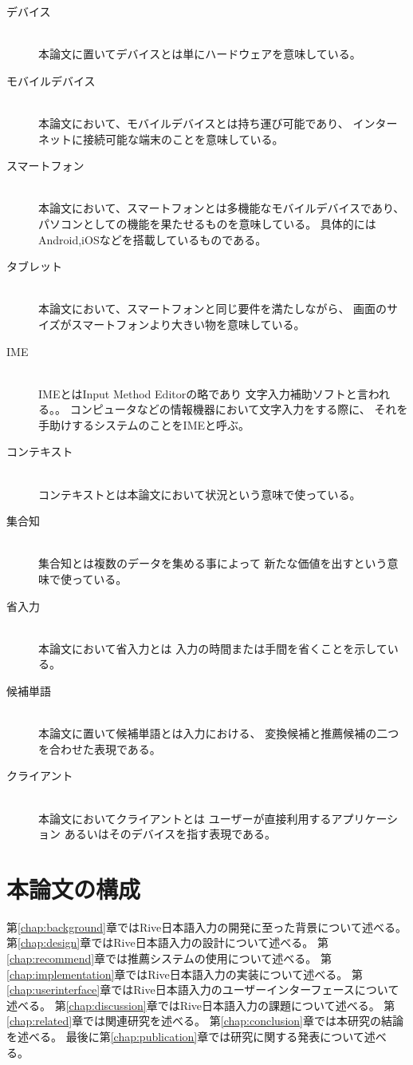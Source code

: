 \begin{description}
  \item[デバイス]\mbox{}\\
    本論文に置いてデバイスとは単にハードウェアを意味している。
  \item[モバイルデバイス]\mbox{}\\
    本論文において、モバイルデバイスとは持ち運び可能であり、
    インターネットに接続可能な端末のことを意味している。
  \item[スマートフォン]\mbox{}\\
    本論文において、スマートフォンとは多機能なモバイルデバイスであり、
    パソコンとしての機能を果たせるものを意味している。
    具体的にはAndroid,iOSなどを搭載しているものである。
  \item[タブレット]\mbox{}\\
    本論文において、スマートフォンと同じ要件を満たしながら、
    画面のサイズがスマートフォンより大きい物を意味している。
  \item[IME]\mbox{}\\
    IMEとはInput Method Editorの略であり
    文字入力補助ソフトと言われる。。
    コンピュータなどの情報機器において文字入力をする際に、
    それを手助けするシステムのことをIMEと呼ぶ。
  \item[コンテキスト]\mbox{}\\
    コンテキストとは本論文において状況という意味で使っている。
  \item[集合知]\mbox{}\\
    集合知とは複数のデータを集める事によって
    新たな価値を出すという意味で使っている。
  \item[省入力]\mbox{}\\
    本論文において省入力とは
    入力の時間または手間を省くことを示している。
  \item[候補単語]\mbox{}\\
    本論文に置いて候補単語とは入力における、
    変換候補と推薦候補の二つを合わせた表現である。
  \item[クライアント]\mbox{}\\
    本論文においてクライアントとは
    ユーザーが直接利用するアプリケーション
    あるいはそのデバイスを指す表現である。
\end{description}

\section{本論文の構成}
第\ref{chap:background}章ではRive日本語入力の開発に至った背景について述べる。
第\ref{chap:design}章ではRive日本語入力の設計について述べる。
第\ref{chap:recommend}章では推薦システムの使用について述べる。
第\ref{chap:implementation}章ではRive日本語入力の実装について述べる。
第\ref{chap:userinterface}章ではRive日本語入力のユーザーインターフェースについて述べる。
第\ref{chap:discussion}章ではRive日本語入力の課題について述べる。
第\ref{chap:related}章では関連研究を述べる。
第\ref{chap:conclusion}章では本研究の結論を述べる。
最後に第\ref{chap:publication}章では研究に関する発表について述べる。
